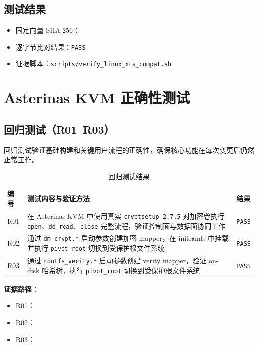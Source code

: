 \subsection{测试结果}
\begin{itemize}
    \item 固定向量 SHA-256：\texttt{}
    \item 逐字节比对结果：\texttt{PASS}
    \item 证据脚本：\texttt{scripts/verify\_linux\_xts\_compat.sh}
\end{itemize}

\section{Asterinas KVM 正确性测试}

\subsection{回归测试（R01--R03）}

回归测试验证基础构建和关键用户流程的正确性，确保核心功能在每次变更后仍然正常工作。

\begin{table}[H]
    \centering
    \caption{回归测试结果}
    \begin{tabular}{p{}p{}p{}}
        \toprule
        \textbf{编号} & \textbf{测试内容与验证方法} & \textbf{结果} \\
        \midrule
        R01 & 在 Asterinas KVM 中使用真实 \texttt{cryptsetup 2.7.5} 对加密卷执行 \texttt{open}、\texttt{dd read}、\texttt{close} 完整流程，验证控制面与数据面协同工作 & \texttt{PASS} \\
        R02 & 通过 \texttt{dm\_crypt.*} 启动参数创建加密 mapper，在 initramfs 中挂载并执行 \texttt{pivot\_root} 切换到受保护根文件系统 & \texttt{PASS} \\
        R03 & 通过 \texttt{rootfs\_verity.*} 启动参数创建 verity mapper，验证 on-disk 哈希树，执行 \texttt{pivot\_root} 切换到受保护根文件系统 & \texttt{PASS} \\
        \bottomrule
    \end{tabular}
\end{table}

\textbf{证据路径}：
\begin{itemize}
    \item R01：\texttt{}
    \item R02：\texttt{}
    \item R03：\texttt{}
\end{itemize}

